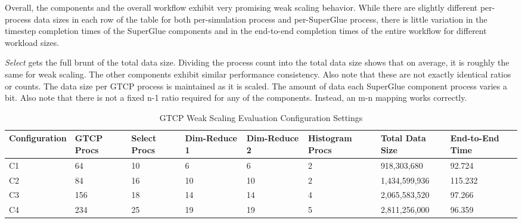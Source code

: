 Overall, the components and the overall workflow
exhibit very promising weak scaling behavior.
While there are slightly different per-process
data sizes in each row of the table for both
per-simulation process and per-SuperGlue process,
there is little variation in the timestep completion
times of the SuperGlue components and in the end-to-end
completion times of the entire workflow for different
workload sizes.

{\em Select} gets the full brunt of the total data size. Dividing the process
count into the total data size shows that on average, it is roughly the same
for weak scaling. The other components exhibit similar performance consistency.
Also note that these are not exactly identical ratios or counts.  The data size
per GTCP process is maintained as it is scaled. The amount of data each
SuperGlue component process varies a bit. Also note that there is not a fixed
n-1 ratio required for any of the components. Instead, an m-n mapping works
correctly.


\begin{table}[tbp]
\centering
\caption{GTCP Weak Scaling Evaluation Configuration Settings}
\label{tab:eval-weak-gtcp-1}
\vspace{-0.15in}
\begin{tabular}{|l|l|l|l|l|l|l|l|}
\hline
Configuration & GTCP Procs & Select Procs & Dim-Reduce 1 & Dim-Reduce 2 & Histogram Procs & Total Data Size & End-to-End Time\\
\hline
C1 & 64 & 10 & 6 & 6 & 2 & 918,303,680 & 92.724\\
\hline
C2 & 84 & 16 & 10 & 10 & 2 & 1,434,599,936 & 115.232\\
\hline
C3 & 156 & 18 & 14 & 14 & 4 & 2,065,583,520 & 97.266\\
\hline
C4 & 234 & 25 & 19 & 19 & 5 & 2,811,256,000 & 96.359\\
\hline
\end{tabular}
\vspace{-0.15in}
\end{table}

